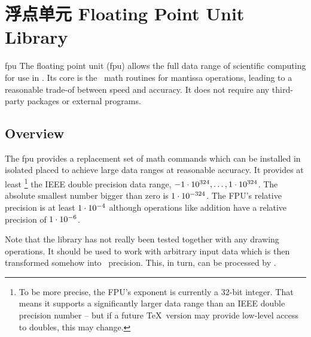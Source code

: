 %
%
%


\section{浮点单元 Floating Point Unit Library}
\label{pgfmath-floatunit}
\label{section-library-fpu}

{}

\begingroup
{}

\begin{pgflibrary}{fpu}
    The floating point unit (fpu) allows the full data range of scientific
    computing for use in \pgfname. Its core is the \pgfname\ math routines for
    mantissa operations, leading to a reasonable trade-of between speed and
    accuracy. It does not require any third-party packages or external
    programs.
\end{pgflibrary}


\subsection{Overview}

The fpu provides a replacement set of math commands which can be installed in
isolated placed to achieve large data ranges at reasonable accuracy. It
provides at least%
    \footnote{To be more precise, the FPU's exponent is currently a 32-bit
    integer. That means it supports a significantly larger data range than an
    IEEE double precision number -- but if a future \TeX\ version may provide
    low-level access to doubles, this may change.}%
the IEEE double precision data range, $\pgfmathprintnumber{-1e+324}, \dotsc,
\pgfmathprintnumber{+1e324}$. The absolute smallest number bigger than zero is
$\pgfmathprintnumber{1e-324}$. The FPU's relative precision is at least
$\pgfmathprintnumber{1e-4}$ although operations like addition have a relative
precision of $\pgfmathprintnumber{1e-6}$.

Note that the library has not really been tested together with any drawing
operations. It should be used to work with arbitrary input data which is then
transformed somehow into \pgfname\ precision. This, in turn, can be processed
by \pgfname.


